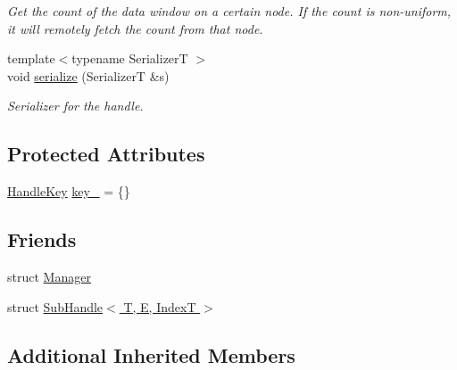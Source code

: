 \begin{DoxyCompactItemize}
\begin{DoxyCompactList}\small\item\em Get the count of the data window on a certain node. If the count is non-\/uniform, it will remotely fetch the count from that node. \end{DoxyCompactList}\item 
{\footnotesize template$<$typename SerializerT $>$ }\\void \hyperlink{structvt_1_1rdma_1_1_handle_3_01_t_00_01_e_00_01_index_t_00_01typename_01std_1_1enable__if__t_3_d15dac1b5db6e2bc0fb0b8aca42b1456_a861a97549fb4aaa9880401dbdf2e0a23}{serialize} (SerializerT \&s)
\begin{DoxyCompactList}\small\item\em Serializer for the handle. \end{DoxyCompactList}\end{DoxyCompactItemize}
\subsection*{Protected Attributes}
\begin{DoxyCompactItemize}
\item 
\hyperlink{structvt_1_1rdma_1_1_handle_key}{Handle\+Key} \hyperlink{structvt_1_1rdma_1_1_handle_3_01_t_00_01_e_00_01_index_t_00_01typename_01std_1_1enable__if__t_3_d15dac1b5db6e2bc0fb0b8aca42b1456_a1219d32435dff7029290180c23004b93}{key\+\_\+} = \{\}
\end{DoxyCompactItemize}
\subsection*{Friends}
\begin{DoxyCompactItemize}
\item 
struct \hyperlink{structvt_1_1rdma_1_1_handle_3_01_t_00_01_e_00_01_index_t_00_01typename_01std_1_1enable__if__t_3_d15dac1b5db6e2bc0fb0b8aca42b1456_a1fd6b9bc3f72bb2b64e602de3982929d}{Manager}
\item 
struct \hyperlink{structvt_1_1rdma_1_1_handle_3_01_t_00_01_e_00_01_index_t_00_01typename_01std_1_1enable__if__t_3_d15dac1b5db6e2bc0fb0b8aca42b1456_aa597d7381f8793417b0656cbaf1625f0}{Sub\+Handle$<$ T, E, Index\+T $>$}
\end{DoxyCompactItemize}
\subsection*{Additional Inherited Members}


